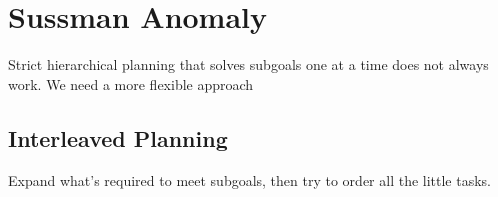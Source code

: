 \section{Sussman Anomaly}

  Strict hierarchical planning that solves subgoals one at a time does not
  always work. We need a more flexible approach

  \subsection{Interleaved Planning}

    Expand what's required to meet subgoals, then try
    to order all the little tasks.